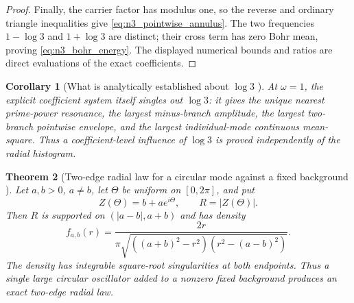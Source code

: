 \documentclass[11pt]{amsart}
\numberwithin{equation}{section}
\theoremstyle{plain}
\newtheorem{theorem}{Theorem}[section]
\newtheorem{corollary}[theorem]{Corollary}
\theoremstyle{definition}
\theoremstyle{remark}
\newcommand{\1}{\mathbf{1}}
\begin{document}
\begin{proof}
Finally, the carrier factor has modulus one, so the reverse and ordinary
triangle inequalities give \eqref{eq:n3_pointwise_annulus}.  The two
frequencies $1-\log3$ and $1+\log3$ are distinct; their cross term has zero
Bohr mean, proving \eqref{eq:n3_bohr_energy}.  The displayed numerical
bounds and ratios are direct evaluations of the exact coefficients.
\end{proof}

\begin{corollary}[What is analytically established about \(\log 3\) {}]
\label{cor:n3_influence_scope}
At $\omega=1$, the explicit coefficient system itself singles out
$\log3$: it gives the unique nearest prime-power resonance, the largest
minus-branch amplitude, the largest two-branch pointwise envelope, and the
largest individual-mode continuous mean-square.  Thus a coefficient-level
influence of $\log3$ is proved independently of the radial histogram.
\end{corollary}


\begin{theorem}[Two-edge radial law for a circular mode against a fixed background {}]
\label{thm:fixed_background_radial_law}
Let \(a,b>0\), \(a\neq b\), let \(\Theta\) be uniform on
\([0,2\pi]\), and put
\begin{equation}
Z(\Theta)=b+ae^{i\Theta},
\qquad
R=|Z(\Theta)|.
\label{eq:fixed_background_circular_model}
\end{equation}
Then \(R\) is supported on \((|a-b|,a+b)\) and has density
\begin{equation}
\boxed{
f_{a,b}(r)
=
\frac{2r}
{\pi\sqrt{((a+b)^2-r^2)(r^2-(a-b)^2)}}.
}
\label{eq:fixed_background_radial_density}
\end{equation}
The density has integrable square-root singularities at both endpoints.
Thus a single large circular oscillator added to a nonzero fixed background
produces an exact two-edge radial law.
\end{theorem}
\end{document}
